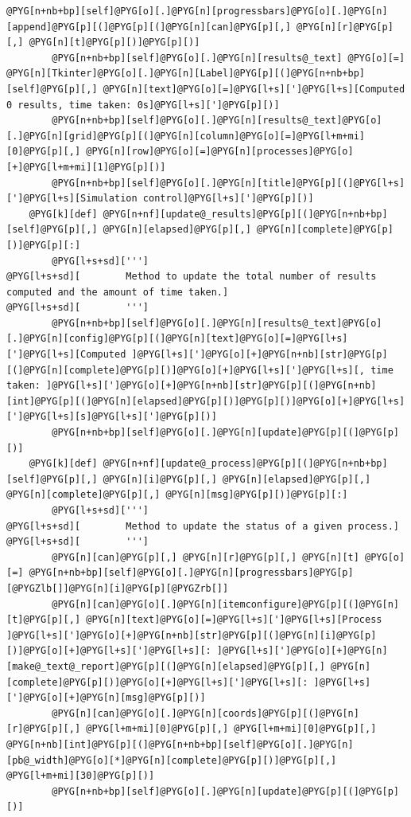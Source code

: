 \documentclass[letterpaper,10pt,english]{manual}
\begin{document}
\begin{Verbatim}[commandchars=@\[\]]
            @PYG[n+nb+bp][self]@PYG[o][.]@PYG[n][progressbars]@PYG[o][.]@PYG[n][append]@PYG[p][(]@PYG[p][(]@PYG[n][can]@PYG[p][,] @PYG[n][r]@PYG[p][,] @PYG[n][t]@PYG[p][)]@PYG[p][)]
        @PYG[n+nb+bp][self]@PYG[o][.]@PYG[n][results@_text] @PYG[o][=] @PYG[n][Tkinter]@PYG[o][.]@PYG[n][Label]@PYG[p][(]@PYG[n+nb+bp][self]@PYG[p][,] @PYG[n][text]@PYG[o][=]@PYG[l+s][']@PYG[l+s][Computed 0 results, time taken: 0s]@PYG[l+s][']@PYG[p][)]
        @PYG[n+nb+bp][self]@PYG[o][.]@PYG[n][results@_text]@PYG[o][.]@PYG[n][grid]@PYG[p][(]@PYG[n][column]@PYG[o][=]@PYG[l+m+mi][0]@PYG[p][,] @PYG[n][row]@PYG[o][=]@PYG[n][processes]@PYG[o][+]@PYG[l+m+mi][1]@PYG[p][)]
        @PYG[n+nb+bp][self]@PYG[o][.]@PYG[n][title]@PYG[p][(]@PYG[l+s][']@PYG[l+s][Simulation control]@PYG[l+s][']@PYG[p][)]
    @PYG[k][def] @PYG[n+nf][update@_results]@PYG[p][(]@PYG[n+nb+bp][self]@PYG[p][,] @PYG[n][elapsed]@PYG[p][,] @PYG[n][complete]@PYG[p][)]@PYG[p][:]
        @PYG[l+s+sd][''']
@PYG[l+s+sd][        Method to update the total number of results computed and the amount of time taken.]
@PYG[l+s+sd][        ''']
        @PYG[n+nb+bp][self]@PYG[o][.]@PYG[n][results@_text]@PYG[o][.]@PYG[n][config]@PYG[p][(]@PYG[n][text]@PYG[o][=]@PYG[l+s][']@PYG[l+s][Computed ]@PYG[l+s][']@PYG[o][+]@PYG[n+nb][str]@PYG[p][(]@PYG[n][complete]@PYG[p][)]@PYG[o][+]@PYG[l+s][']@PYG[l+s][, time taken: ]@PYG[l+s][']@PYG[o][+]@PYG[n+nb][str]@PYG[p][(]@PYG[n+nb][int]@PYG[p][(]@PYG[n][elapsed]@PYG[p][)]@PYG[p][)]@PYG[o][+]@PYG[l+s][']@PYG[l+s][s]@PYG[l+s][']@PYG[p][)]
        @PYG[n+nb+bp][self]@PYG[o][.]@PYG[n][update]@PYG[p][(]@PYG[p][)]
    @PYG[k][def] @PYG[n+nf][update@_process]@PYG[p][(]@PYG[n+nb+bp][self]@PYG[p][,] @PYG[n][i]@PYG[p][,] @PYG[n][elapsed]@PYG[p][,] @PYG[n][complete]@PYG[p][,] @PYG[n][msg]@PYG[p][)]@PYG[p][:]
        @PYG[l+s+sd][''']
@PYG[l+s+sd][        Method to update the status of a given process.]
@PYG[l+s+sd][        ''']
        @PYG[n][can]@PYG[p][,] @PYG[n][r]@PYG[p][,] @PYG[n][t] @PYG[o][=] @PYG[n+nb+bp][self]@PYG[o][.]@PYG[n][progressbars]@PYG[p][@PYGZlb[]]@PYG[n][i]@PYG[p][@PYGZrb[]]
        @PYG[n][can]@PYG[o][.]@PYG[n][itemconfigure]@PYG[p][(]@PYG[n][t]@PYG[p][,] @PYG[n][text]@PYG[o][=]@PYG[l+s][']@PYG[l+s][Process ]@PYG[l+s][']@PYG[o][+]@PYG[n+nb][str]@PYG[p][(]@PYG[n][i]@PYG[p][)]@PYG[o][+]@PYG[l+s][']@PYG[l+s][: ]@PYG[l+s][']@PYG[o][+]@PYG[n][make@_text@_report]@PYG[p][(]@PYG[n][elapsed]@PYG[p][,] @PYG[n][complete]@PYG[p][)]@PYG[o][+]@PYG[l+s][']@PYG[l+s][: ]@PYG[l+s][']@PYG[o][+]@PYG[n][msg]@PYG[p][)]
        @PYG[n][can]@PYG[o][.]@PYG[n][coords]@PYG[p][(]@PYG[n][r]@PYG[p][,] @PYG[l+m+mi][0]@PYG[p][,] @PYG[l+m+mi][0]@PYG[p][,] @PYG[n+nb][int]@PYG[p][(]@PYG[n+nb+bp][self]@PYG[o][.]@PYG[n][pb@_width]@PYG[o][*]@PYG[n][complete]@PYG[p][)]@PYG[p][,] @PYG[l+m+mi][30]@PYG[p][)]
        @PYG[n+nb+bp][self]@PYG[o][.]@PYG[n][update]@PYG[p][(]@PYG[p][)]


\end{Verbatim}
\end{document}
